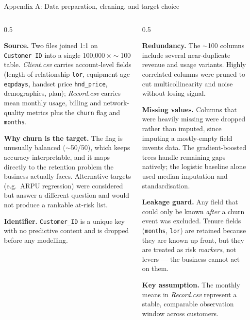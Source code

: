 \documentclass[aspectratio=169]{beamer}
\begin{document}
\begin{frame}{Appendix A: Data preparation, cleaning, and target choice}
    \begin{columns}[T]
    \begin{column}{0.5\textwidth}
        {\fontsize{5}{6}\selectfont
        \textbf{Source.} Two files joined 1:1 on \texttt{Customer\_ID} into a
        single 100{,}000\,$\times\sim$100 table. \textit{Client.csv} carries
        account-level fields (length-of-relationship \texttt{lor}, equipment age
        \texttt{eqpdays}, handset price \texttt{hnd\_price}, demographics, plan);
        \textit{Record.csv} carries mean monthly usage, billing and
        network-quality metrics plus the \texttt{churn} flag and \texttt{months}.

        \medskip
        \textbf{Why churn is the target.} The flag is unusually balanced
        ($\sim$50/50), which keeps accuracy interpretable, and it maps directly
        to the retention problem the business actually faces. Alternative targets
        (e.g.\ ARPU regression) were considered but answer a different question
        and would not produce a rankable at-risk list.

        \medskip
        \textbf{Identifier.} \texttt{Customer\_ID} is a unique key with no
        predictive content and is dropped before any modelling.
        \par}
    \end{column}
    \begin{column}{0.5\textwidth}
        {\fontsize{5}{6}\selectfont
        \textbf{Redundancy.} The $\sim$100 columns include several near-duplicate
        revenue and usage variants. Highly correlated columns were pruned to cut
        multicollinearity and noise without losing signal.

        \medskip
        \textbf{Missing values.} Columns that were heavily missing were dropped
        rather than imputed, since imputing a mostly-empty field invents data.
        The gradient-boosted trees handle remaining gaps natively; the logistic
        baseline alone used median imputation and standardisation.

        \medskip
        \textbf{Leakage guard.} Any field that could only be known \emph{after} a
        churn event was excluded. Tenure fields (\texttt{months}, \texttt{lor})
        are retained because they are known up front, but they are treated as
        risk \emph{markers}, not levers --- the business cannot act on them.

        \medskip
        \textbf{Key assumption.} The monthly means in \textit{Record.csv}
        represent a stable, comparable observation window across customers.
        \par}
    \end{column}
    \end{columns}
\end{frame}
\end{document}
